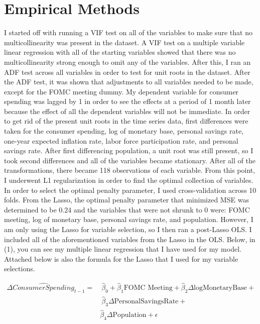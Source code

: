 \documentclass[12pt,english]{article}
\begin{document}
\section{Empirical Methods}\label{sec:methods}
I started off with running a VIF test on all of the variables to make sure that no multicollinearity was present in the dataset. A VIF test on a multiple variable linear regression with all of the starting variables showed that there was no multicollinearity strong enough to omit any of the variables. After this, I ran an ADF test across all variables in order to test for unit roots in the dataset. After the ADF test, it was shown that adjustments to all variables needed to be made, except for the FOMC meeting dummy. My dependent variable for consumer spending was lagged by 1 in order to see the effects at a period of 1 month later because the effect of all the dependent variables will not be immediate. In order to get rid of the present unit roots in the time series data, first differences were taken for the consumer spending, log of monetary base, personal savings rate, one-year expected inflation rate, labor force participation rate, and personal savings rate. After first differencing population, a unit root was still present, so I took second differences and all of the variables became stationary. After all of the transformations, there became 118 observations of each variable. From this point, I underwent L1 regularization in order to find the optimal collection of variables. In order to select the optimal penalty parameter, I used cross-validation across 10 folds. From the Lasso, the optimal penalty parameter that minimized MSE was determined to be 0.24 and the variables that were not shrunk to 0 were: FOMC meeting, log of monetary base, personal savings rate, and population. However, I am only using the Lasso for variable selection, so I then ran a post-Lasso OLS. I included all of the aforementioned variables from the Lasso in the OLS. Below, in (1), you can see my multiple linear regression that I have used for my model. Attached below is also the formula for the Lasso that I used for my variable selections. 

\begin{equation}
\label{eq:1}
\begin{aligned}
\Delta \hat{ConsumerSpending}_{t-1} = &\ \hat{\beta}_0 + \hat{\beta}_1 \text{FOMC Meeting} + \hat{\beta}_2 \Delta\text{logMonetaryBase} + \\
&\ \hat{\beta}_3 \Delta\text{PersonalSavingsRate} + \\&\hat{\beta}_4\Delta\text{Population}  + \epsilon
\end{aligned}
\end{equation}
\end{document}
